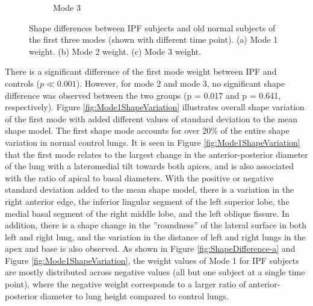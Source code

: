 \begin{figure}[htbp]
\begin{subfigure}{.65\linewidth}
  \caption{Mode 3}
  \label{fig:ShapeDifference-c}
\end{subfigure}
\caption{ Shape differences between IPF subjects and old normal subjects of the first three modes (shown with different time point). (a) Mode 1 weight. (b) Mode 2 weight. (c) Mode 3  weight.}
\label{fig:ShapeDifference}
\end{figure}


There is a significant difference of the first mode weight between IPF and controls ($p\ll 0.001$). However, for mode 2 and mode 3, no significant shape difference was observed between the two groups (p = 0.017 and p = 0.641, respectively). Figure \ref{fig:Mode1ShapeVariation} illustrates overall shape variation of the first mode with added different values of standard deviation to the mean shape model. The first shape mode accounts for over 20\% of the entire shape variation in normal control lungs. It is seen in Figure \ref{fig:Mode1ShapeVariation} that the first mode relates to the largest change in the anterior-posterior diameter of the lung with a lateromedial tilt towards both apices, and is also associated with the ratio of apical to basal diameters. With the positive or negative standard deviation added to the mean shape model, there is a variation in the right anterior edge, the inferior lingular segment of the left superior lobe, the medial basal segment of the right middle lobe, and the left oblique fissure. In addition, there is a shape change in the ''roundness'' of the lateral surface in both left and right lung, and the variation in the distance of left and right lungs in the apex and base is also observed. As shown in Figure \ref{fig:ShapeDifference-a} and Figure \ref{fig:Mode1ShapeVariation}, the weight values of Mode 1 for IPF subjects are mostly distributed across negative values (all but one subject at a single time point), where the negative weight corresponds to a larger ratio of anterior-posterior diameter to lung height compared to control lungs. 

